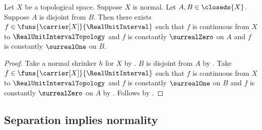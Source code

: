 \begin{theorem}\label{urysohn_lemma}
    Let $X$ be a topological space.
    Suppose $X$ is normal.
    Let $A,B\in\closeds{X}$.
    Suppose $A$ is disjoint from $B$.
    Then there exists $f\in\funs{\carrier[X]}{\RealUnitInterval}$
        such that $f$ is continuous from $X$ to
        $\RealUnitIntervalTopology$ and
        $f$ is constantly $\surrealZero$ on $A$ and
        $f$ is constantly $\surrealOne$ on $B$.
\end{theorem}
\begin{proof}
    Take a normal shrinker $h$ for $X$
        by .
    $B$ is disjoint from $A$ by .
    Take $f\in\funs{\carrier[X]}{\RealUnitInterval}$ such that
        $f$ is continuous from $X$ to $\RealUnitIntervalTopology$ and
        $f$ is constantly $\surrealOne$ on $B$ and
        $f$ is constantly $\surrealZero$ on $A$
        by .
    Follows by \auto.
\end{proof}

\subsection{Separation implies normality}

